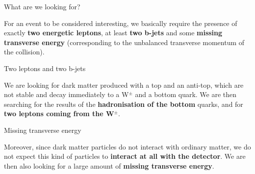 \documentclass[8 pt]{beamer}
\begin{document}
\begin{frame}{What are we looking for?}

	\justifying
	For an event to be considered interesting, we basically require the presence of exactly \textbf{two energetic leptons}, at least \textbf{two b-jets} and some \textbf{missing transverse energy} (corresponding to the unbalanced transverse momentum of the collision). \vspace{8pt}

	\begin{exampleblock}{} Two leptons and two b-jets \end{exampleblock} \vspace{8pt}

	\begin{minipage}[c]{.59\linewidth}
	\justifying
	We are looking for dark matter produced with a top and an anti-top, which are not stable and decay immediately to a W$^\pm$ and a bottom quark. We are then searching for the results of the \textbf{hadronisation of the bottom} quarks, and for \textbf{two leptons coming from the W$^\pm$}. \vfill
   	\end{minipage} \hfill
   	\begin{minipage}[c]{.39\linewidth}
	\end{minipage} \hfill \vfill
	
	\begin{exampleblock}{} Missing transverse energy \end{exampleblock}
	
	\vspace{8pt}
	\justifying
	Moreover, since dark matter particles do not interact with ordinary matter, we do not expect this kind of particles to \textbf{interact at all with the detector}. We are then also looking for a large amount of \textbf{missing transverse energy}. \vfill

\end{frame}
\end{document}
